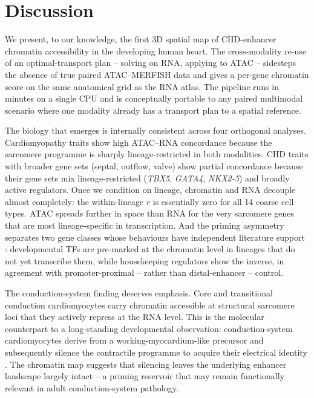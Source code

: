 \documentclass[11pt,a4paper]{article}
\begin{document}
\section{Discussion}

We present, to our knowledge, the first 3D spatial map of CHD-enhancer
chromatin accessibility in the developing human heart. The cross-modality
re-use of an optimal-transport plan -- solving on RNA, applying to ATAC --
sidesteps the absence of true paired ATAC--MERFISH data and gives a per-gene
chromatin score on the same anatomical grid as the RNA atlas. The pipeline
runs in minutes on a single CPU and is conceptually portable to any paired
multimodal scenario where one modality already has a transport plan to a
spatial reference.

The biology that emerges is internally consistent across four orthogonal
analyses. Cardiomyopathy traits show high ATAC--RNA concordance because the
sarcomere programme is sharply lineage-restricted in both modalities. CHD
traits with broader gene sets (septal, outflow, valve) show partial
concordance because their gene sets mix lineage-restricted (\emph{TBX5},
\emph{GATA4}, \emph{NKX2-5}) and broadly active regulators. Once we condition
on lineage, chromatin and RNA decouple almost completely: the within-lineage
\(r\) is essentially zero for all 14 coarse cell types. ATAC spreads further
in space than RNA for the very sarcomere genes that are most lineage-specific
in transcription. And the priming asymmetry separates two gene classes whose
behaviours have independent literature support
\citep{wamstad2012priming,paige2012priming,ameen2022cardiogenesis}:
developmental TFs are pre-marked at the chromatin level in lineages that do
not yet transcribe them, while housekeeping regulators show the inverse, in
agreement with promoter-proximal -- rather than distal-enhancer -- control.

The conduction-system finding deserves emphasis. Core and transitional
conduction cardiomyocytes carry chromatin accessible at structural sarcomere
loci that they actively repress at the RNA level. This is the molecular
counterpart to a long-standing developmental observation: conduction-system
cardiomyocytes derive from a working-myocardium-like precursor and
subsequently silence the contractile programme to acquire their electrical
identity \citep{christoffels2009conduction}. The chromatin map suggests that
silencing leaves the underlying enhancer landscape largely intact -- a
priming reservoir that may remain functionally relevant in
adult conduction-system pathology.
\end{document}
